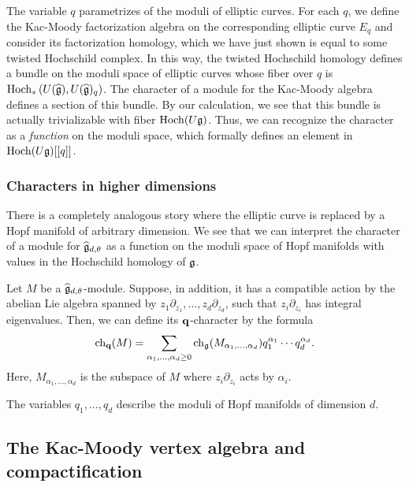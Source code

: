 The variable $q$ parametrizes of the moduli of elliptic curves.
For each $q$, we define the Kac-Moody factorization algebra on the corresponding elliptic curve $E_q$ and consider its factorization homology, which we have just shown is equal to some twisted Hochschild complex.
In this way, the twisted Hochschild homology defines a bundle on the moduli space of elliptic curves whose fiber over $q$ is ${\rm Hoch}_*\left(U(\widehat{\mathfrak g}), U(\widehat{\mathfrak g})_q \right)$. 
The character of a module for the Kac-Moody algebra defines a section of this bundle. 
By our calculation, we see that this bundle is actually trivializable with fiber ${\rm Hoch}(U \mathfrak g)$.
Thus, we can recognize the character as a {\em function} on the moduli space, which formally defines an element in ${\rm Hoch}(U \mathfrak g) [[q]]$. 

\subsubsection{Characters in higher dimensions}

There is a completely analogous story where the elliptic curve is replaced by a Hopf manifold of arbitrary dimension. 
We see that we can interpret the character of a module for $\widehat{\mathfrak g}_{d,\theta}$ as a function on the moduli space of Hopf manifolds with values in the Hochschild homology of $\mathfrak g$. 

Let $M$ be a $\widehat{\mathfrak g}_{d,\theta}$-module.
Suppose, in addition, it has a compatible action by the abelian Lie algebra spanned by $z_1 \partial_{z_1},\ldots,z_d \partial_{z_d}$, such that $z_i \partial_{z_i}$ has integral eigenvalues. 
Then, we can define its ${\bf q}$-character by the formula
\[
{\rm ch}_{\bf q}(M) = \sum_{\alpha_1,\ldots,\alpha_d \geq 0} {\rm ch}_{\mathfrak g} (M_{\alpha_1,\ldots,\alpha_d}) q_1^{\alpha_1}\cdots q_d^{\alpha_d} .
\]
Here, $M_{\alpha_1,\ldots,\alpha_d}$ is the subspace of $M$ where $z_i \partial_{z_i}$ acts by $\alpha_i$. 

The variables $q_1,\ldots,q_d$ describe the moduli of Hopf manifolds of dimension $d$. 

\subsection{The Kac-Moody vertex algebra and compactification} 

